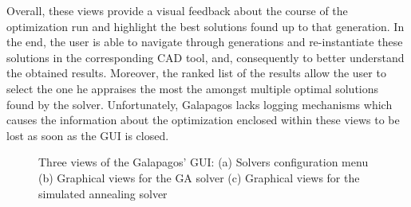 	Overall, these views provide a visual feedback about the course of the optimization run and highlight the best solutions found up to that generation. In the end, the user is able to navigate through generations and re-instantiate these solutions in the corresponding \ac{CAD} tool, and, consequently to better understand the obtained results. Moreover, the ranked list of the results allow the user to select the one he appraises the most the amongst multiple optimal solutions found by the solver. Unfortunately, Galapagos lacks logging mechanisms which causes the information about the optimization enclosed within these views to be lost as soon as the \ac{GUI} is closed. 
	\begin{figure}[htbp]
		\centering
		\hfill
		\hfill
		
		\caption[Galapagos GUI]{ Three views of the Galapagos' \ac{GUI}: (a) Solvers configuration menu (b) Graphical views for the \ac{GA} solver (c) Graphical views for the simulated annealing solver}
		\label{fig:galapagos}
	\end{figure}
	
